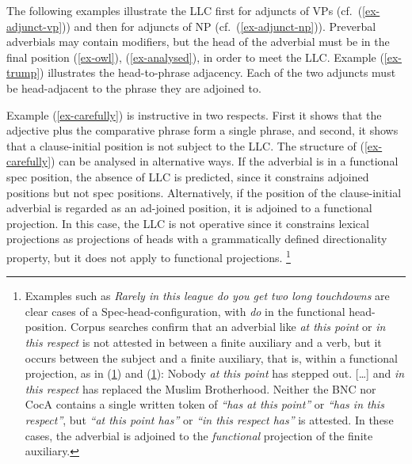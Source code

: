 \documentclass[output=paper
  ,nobabel
  ,uniformtopskip %
]{langscibook}
\begin{document}
The following  examples illustrate the LLC first for adjuncts of VPs (cf.\ (\ref{ex-adjunct-vp}))  and then for adjuncts of NP (cf.\ (\ref{ex-adjunct-np})). Preverbal adverbials may contain modifiers, but the head of the adverbial must be in the final position (\ref{ex-owl}), (\ref{ex-analysed}), in order to meet the LLC. Example (\ref{ex-trump}) illustrates the head-to-phrase adjacency. Each of the two adjuncts must be head-adjacent to the phrase they are adjoined to.
\eal\label{ex-adjunct-vp}
\label{ex-owl}
\label{ex-analysed}
\label{ex-trump}
\label{ex-finch}
\label{ex-carefully}
\label{ex-morecare}
\zl


\noindent
Example (\ref{ex-carefully}) is instructive in two respects. First it shows that the adjective plus the comparative phrase form a single phrase, and second, it shows that a clause-initial position is not subject to the LLC. The structure of (\ref{ex-carefully}) can be analysed in alternative ways. If the adverbial is in a functional spec position, the absence of LLC is predicted, since it constrains adjoined positions but not spec positions. Alternatively, if the position of the clause-initial adverbial is regarded as an ad-joined position, it is adjoined to a functional projection. In this case, the LLC is not operative since it constrains lexical projections as projections of heads with a grammatically defined directionality property, but it does not apply to functional projections.%
%
\footnote{Examples such as \emph{Rarely in this league do you get two long touchdowns} are clear cases of a Spec-head-configuration, with \emph{do} in the functional head-position. Corpus searches confirm that an adverbial like \emph{at this point} or \emph{in this respect} is not attested in between a finite auxiliary and a verb, but it occurs between the subject and a finite auxiliary, that is, within a functional projection, as in (\ref{ex-nobody}) and (\ref{ex-and}):
    \ea
    \label{ex-nobody} Nobody \emph{at this point} has stepped out.
    \z
    \ea\label{ex-and} [\ldots] and \emph{in this respect} has replaced the Muslim Brotherhood.
    \z
Neither the BNC nor CocA contains a single written token of \emph{``has  at this point''} or \emph{``has in this respect''}, but \emph{``at this point has''} or \emph{``in this respect has''} is attested. In these cases, the adverbial is adjoined to the \emph{functional} projection of the finite auxiliary.}
\end{document}
